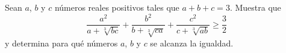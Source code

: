 Sean $a$, $b$ y $c$ números reales positivos tales que $a + b + c = 3$. Muestra que 
\[ \frac{a^2}{a + \sqrt[3]{bc}} + \frac{b^2}{b + \sqrt[3]{ca}} + \frac{c^2}{c + \sqrt[3]{ab}} \geq \frac{3}{2} \]
y determina para qué números $a$, $b$ y $c$ se alcanza la igualdad.
